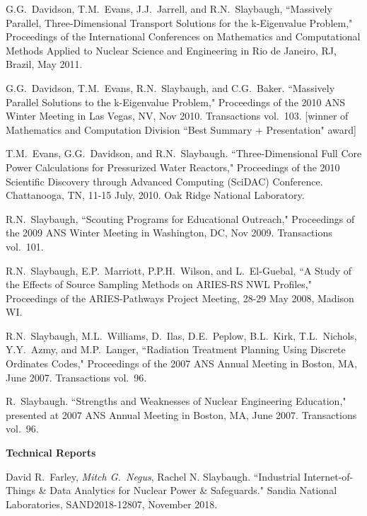 \begin{bibsection}
\item G.G.\ Davidson, T.M.\ Evans, J.J.\ Jarrell, and R.N.\ Slaybaugh, ``Massively Parallel, Three-Dimensional Transport Solutions for the k-Eigenvalue Problem," Proceedings of the International Conferences on Mathematics and Computational Methods Applied to Nuclear Science and Engineering in Rio de Janeiro, RJ, Brazil, May 2011.

\item G.G.\ Davidson, T.M.\ Evans, R.N.\ Slaybaugh, and C.G.\ Baker.  ``Massively Parallel Solutions to the k-Eigenvalue Problem," Proceedings of the 2010 ANS Winter Meeting in Las Vegas, NV, Nov 2010. Transactions vol.\ 103. [winner of Mathematics and Computation Division ``Best Summary + Presentation" award]

\item T.M.\ Evans, G.G.\ Davidson, and R.N.\ Slaybaugh.  ``Three-Dimensional Full Core Power Calculations for Pressurized Water Reactors," Proceedings of the 2010 Scientific Discovery through Advanced Computing (SciDAC) Conference. Chattanooga, TN, 11-15 July, 2010. Oak Ridge National Laboratory.

\item R.N.\ Slaybaugh, ``Scouting Programs for Educational Outreach," Proceedings of the 2009 ANS Winter Meeting in Washington, DC, Nov 2009. Transactions vol.\ 101.

\item R.N.\ Slaybaugh, E.P.\ Marriott, P.P.H.\ Wilson, and L.\ El-Guebal, ``A Study of the Effects of Source Sampling Methods on ARIES-RS NWL Profiles," Proceedings of the ARIES-Pathways Project Meeting, 28-29 May 2008, Madison WI. 

\item R.N.\ Slaybaugh, M.L.\ Williams, D.\ Ilas, D.E.\ Peplow, B.L.\ Kirk, T.L.\ Nichols, Y.Y.\ Azmy, and M.P.\ Langer, ``Radiation Treatment Planning Using Discrete Ordinates Codes," Proceedings of the 2007 ANS Annual Meeting in Boston, MA, June 2007. Transactions vol.\ 96.

\item R.\ Slaybaugh. ``Strengths and Weaknesses of Nuclear Engineering Education," presented at 2007 ANS Annual Meeting in Boston, MA, June 2007. Transactions vol.\ 96.

\item \textbf{Technical Reports}
\item David R.\ Farley, \textit{Mitch G.\ Negus}, Rachel N.
 Slaybaugh. ``Industrial Internet-of-Things \& Data Analytics for Nuclear Power \& Safeguards." Sandia National Laboratories, SAND2018-12807, November 2018.


\end{bibsection}
